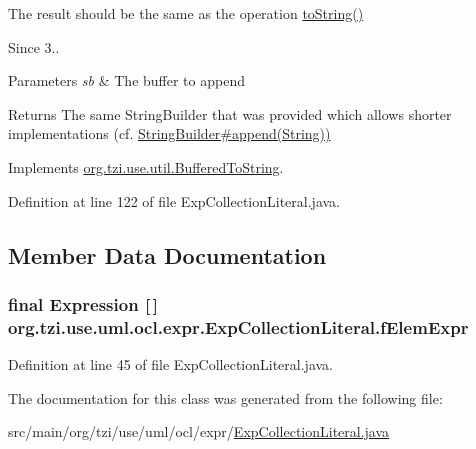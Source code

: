 The result should be the same as the operation \hyperlink{classorg_1_1tzi_1_1use_1_1uml_1_1ocl_1_1expr_1_1_expression_a01192513b1b1adbc44727a67ae14d02e}{to\-String()} 

\begin{DoxySince}{Since}
3.. 
\end{DoxySince}

\begin{DoxyParams}{Parameters}
{\em sb} & The buffer to append \\
\hline
\end{DoxyParams}
\begin{DoxyReturn}{Returns}
The same String\-Builder that was provided which allows shorter implementations (cf. \hyperlink{}{String\-Builder\#append(\-String))} 
\end{DoxyReturn}


Implements \hyperlink{interfaceorg_1_1tzi_1_1use_1_1util_1_1_buffered_to_string_aea95e4e53b18818d50ee253700e6e2d5}{org.\-tzi.\-use.\-util.\-Buffered\-To\-String}.



Definition at line 122 of file Exp\-Collection\-Literal.\-java.



\subsection{Member Data Documentation}
\hypertarget{classorg_1_1tzi_1_1use_1_1uml_1_1ocl_1_1expr_1_1_exp_collection_literal_ae90c09353fd0e5dc925b60fd7409e40c}{
\subsubsection[{f\-Elem\-Expr}]{\setlength{\rightskip}{0pt plus 5cm}final {\bf Expression} \mbox{[}$\,$\mbox{]} org.\-tzi.\-use.\-uml.\-ocl.\-expr.\-Exp\-Collection\-Literal.\-f\-Elem\-Expr\hspace{0.3cm}{\ttfamily [protected]}}}\label{classorg_1_1tzi_1_1use_1_1uml_1_1ocl_1_1expr_1_1_exp_collection_literal_ae90c09353fd0e5dc925b60fd7409e40c}


Definition at line 45 of file Exp\-Collection\-Literal.\-java.



The documentation for this class was generated from the following file\-:\begin{DoxyCompactItemize}
\item 
src/main/org/tzi/use/uml/ocl/expr/\hyperlink{_exp_collection_literal_8java}{Exp\-Collection\-Literal.\-java}\end{DoxyCompactItemize}
